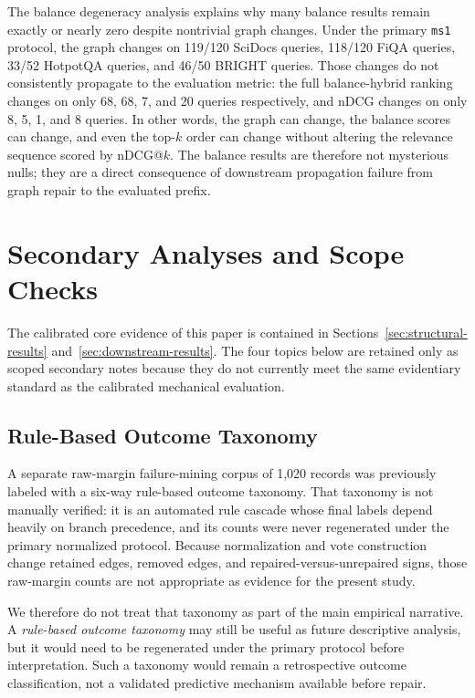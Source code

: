 \documentclass[manuscript,anonymous,review]{acmart}
\begin{document}
The balance degeneracy analysis explains why many balance results remain exactly
or nearly zero despite nontrivial graph changes. Under the primary
\texttt{ms1} protocol, the graph changes on 119/120 SciDocs queries, 118/120
FiQA queries, 33/52 HotpotQA queries, and 46/50 BRIGHT queries. Those changes
do not consistently propagate to the evaluation metric: the full
balance-hybrid ranking changes on only 68, 68, 7, and 20 queries respectively,
and nDCG changes on only 8, 5, 1, and 8 queries. In other words, the graph can
change, the balance scores can change, and even the top-$k$ order can change
without altering the relevance sequence scored by nDCG@$k$. The balance results
are therefore not mysterious nulls; they are a direct consequence of
downstream propagation failure from graph repair to the evaluated prefix.

\clearpage
\section{Secondary Analyses and Scope Checks}
\label{sec:secondary-checks}

The calibrated core evidence of this paper is contained in
Sections~\ref{sec:structural-results} and~\ref{sec:downstream-results}. The
four topics below are retained only as scoped secondary notes because they do
not currently meet the same evidentiary standard as the calibrated mechanical
evaluation.

\subsection{Rule-Based Outcome Taxonomy}
\label{sec:failure-taxonomy}

A separate raw-margin failure-mining corpus of 1{,}020 records was previously
labeled with a six-way rule-based outcome taxonomy. That taxonomy is not
manually verified: it is an automated rule cascade whose final labels depend
heavily on branch precedence, and its counts were never regenerated under the
primary normalized protocol. Because normalization and vote construction change
retained edges, removed edges, and repaired-versus-unrepaired signs, those
raw-margin counts are not appropriate as evidence for the present study.

We therefore do not treat that taxonomy as part of the main empirical
narrative. A \emph{rule-based outcome taxonomy} may still be useful as future
descriptive analysis, but it would need to be regenerated under the primary
protocol before interpretation. Such a taxonomy would remain a retrospective
outcome classification, not a validated predictive mechanism available before
repair.
\end{document}
